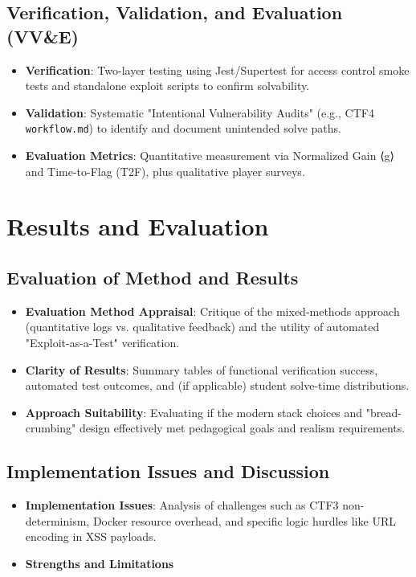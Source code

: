 \subsection{Verification, Validation, and Evaluation (VV\&E)}
\begin{itemize}
\item \textbf{Verification}: Two-layer testing using Jest/Supertest for access control smoke tests and standalone exploit scripts to confirm solvability.
\item \textbf{Validation}: Systematic "Intentional Vulnerability Audits" (e.g., CTF4 \texttt{workflow.md}) to identify and document unintended solve paths.
\item \textbf{Evaluation Metrics}: Quantitative measurement via Normalized Gain ⟨g⟩ and Time-to-Flag (T2F), plus qualitative player surveys.
\end{itemize}

\section{Results and Evaluation}
\subsection{Evaluation of Method and Results}
\begin{itemize}
\item \textbf{Evaluation Method Appraisal}: Critique of the mixed-methods approach (quantitative logs vs. qualitative feedback) and the utility of automated "Exploit-as-a-Test" verification.
\item \textbf{Clarity of Results}: Summary tables of functional verification success, automated test outcomes, and (if applicable) student solve-time distributions.
\item \textbf{Approach Suitability}: Evaluating if the modern stack choices and "bread-crumbing" design effectively met pedagogical goals and realism requirements.
\end{itemize}

\subsection{Implementation Issues and Discussion}
\begin{itemize}
\item \textbf{Implementation Issues}: Analysis of challenges such as CTF3 non-determinism, Docker resource overhead, and specific logic hurdles like URL encoding in XSS payloads.
\item \textbf{Strengths and Limitations}
\end{itemize}

